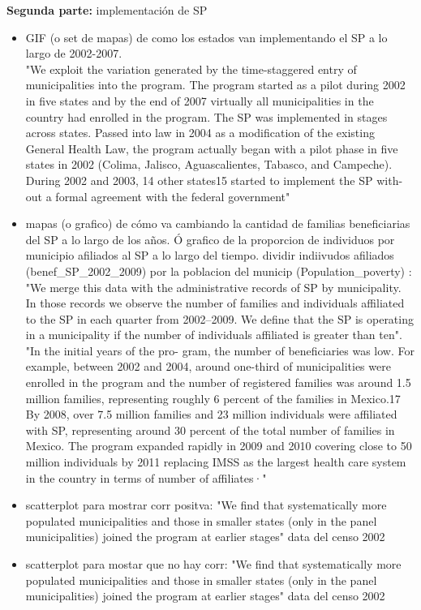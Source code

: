 \textbf{Segunda parte:} implementación de SP 
\begin{itemize}
  \item GIF (o set de mapas) de como los estados van implementando el SP a lo largo de 2002-2007. \\"We exploit the variation generated by the time-staggered entry of municipalities into the program. The program started as a pilot during 2002 in five states and by the end of 2007 virtually all municipalities in the country had enrolled in the program.  The SP was implemented in stages across states. Passed into law in 2004 as a modification of the existing General Health Law, the program actually began with a pilot phase in five states in 2002 (Colima, Jalisco, Aguascalientes, Tabasco, and Campeche). During 2002 and 2003, 14 other states15 started to implement the SP with- out a formal agreement with the federal government"
  \item mapas (o grafico) de cómo va cambiando la cantidad de familias beneficiarias del SP a lo largo de los años.  Ó grafico de la proporcion de individuos por municipio afiliados al SP a lo largo del tiempo. dividir indiivudos afiliados (benef\_SP\_2002\_2009) por la poblacion del municip (Population\_poverty) : \\ "We merge this data with the administrative records of SP by municipality. In those records we observe the number of families and individuals affiliated to the SP in each quarter from 2002–2009. We define that the SP is operating in a municipality if the number of individuals affiliated is greater than ten". \\
  "In the initial years of the pro- gram, the number of beneficiaries was low. For example, between 2002 and 2004, around one-third of municipalities were enrolled in the program and the number of registered families was around 1.5 million families, representing roughly 6 percent of the families in Mexico.17 By 2008, over 7.5 million families and 23 million individuals were affiliated with SP, representing around 30 percent of the total number of families in Mexico. The program expanded rapidly in 2009 and 2010 covering close to 50 million individuals by 2011 replacing IMSS as the largest health care system in the country in terms of number of affiliates·"\\
  \item scatterplot para mostrar corr positva: "We find that systematically more populated municipalities and those in smaller states (only in the panel municipalities) joined the program at earlier stages" data del censo 2002
  \item scatterplot para mostar que no hay corr: "We find that systematically more populated municipalities and those in smaller states (only in the panel municipalities) joined the program at earlier stages" data del censo 2002 
 
\end{itemize}

